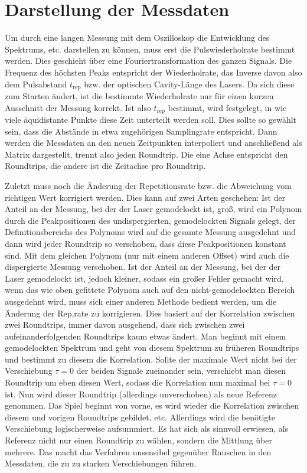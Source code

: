 \documentclass[bachelor,       %
               twoside,        %
               BCOR10mm,       %
               english,ngerman, %
               ]{GAUBM}
\begin{document}
\section{Darstellung der Messdaten}
Um durch eine langen Messung mit dem Oszilloskop die Entwicklung des Spektrums, etc. darstellen zu können, muss erst die Pulswiederholrate bestimmt werden.
Dies geschieht über eine Fouriertransformation des ganzen Signals.
Die Frequenz des höchsten Peaks entspricht der Wiederholrate, das Inverse davon also dem Pulsabstand $t_\text{rep}$ bzw. der optischen Cavity-Länge des Lasers.
Da sich diese zum Starten ändert, ist die bestimmte Wiederholrate nur für einen kurzen Ausschnitt der Messung korrekt.
Ist also $t_\text{rep}$ bestimmt, wird festgelegt, in wie viele äquidistante Punkte diese Zeit unterteilt werden soll.
Dies sollte so gewählt sein, dass die Abstände in etwa zugehörigen Samplingrate entspricht.
Dann werden die Messdaten an den neuen Zeitpunkten interpoliert und anschließend als Matrix dargestellt, trennt also jeden Roundtrip.
Die eine Achse entspricht den Roundtrips, die andere ist die Zeitachse pro Roundtrip.

Zuletzt muss noch die Änderung der Repetitionsrate bzw. die Abweichung vom richtigen Wert korrigiert werden.
Dies kann auf zwei Arten geschehen:
Ist der Anteil an der Messung, bei der der Laser gemodelockt ist, groß, wird ein Polynom durch die Peakpositionen des undispergierten, gemodelockten Signals gelegt, der Definitionsbereichs des Polynoms wird auf die gesamte Messung ausgedehnt und dann wird jeder Roundtrip so verschoben, dass diese Peakpositionen konstant sind.
Mit dem gleichen Polynom (nur mit einem anderen Offset) wird auch die dispergierte Messung verschoben.
Ist der Anteil an der Messung, bei der der Laser gemodelockt ist, jedoch kleiner, sodass ein großer Fehler gemacht wird, wenn das wie oben gefittete Polynom auch auf den nicht-gemodelockten Bereich ausgedehnt wird, muss sich einer anderen Methode bedient werden, um die Änderung der Rep.rate zu korrigieren.
Dies basiert auf der Korrelation zwischen zwei Roundtrips, immer davon ausgehend, dass sich zwischen zwei aufeinanderfolgenden Roundtrips kaum etwas ändert.
Man beginnt mit einem gemodelockten Spektrum und geht von diesem Spektrum zu früheren Roundtrips und bestimmt zu diesem die Korrelation.
Sollte der maximale Wert nicht bei der Verschiebung $\tau=0$ der beiden Signale zueinander sein, verschiebt man diesen Roundtrip um eben diesen Wert, sodass die Korrelation nun maximal bei $\tau=0$ ist.
Nun wird dieser Roundtrip (allerdings unverschoben) als neue Referenz genommen.
Das Spiel beginnt von vorne, es wird wieder die Korrelation zwischen diesem und vorigen Roundtrips gebildet, etc.
Allerdings wird die benötigte Verschiebung logischerweise aufsummiert.
Es hat sich als sinnvoll erwiesen, als Referenz nicht nur einen Roundtrip zu wählen, sondern die Mittlung über mehrere.
Das macht das Verfahren unsensibel gegenüber Rauschen in den Messdaten, die zu zu starken Verschiebungen führen.
\end{document}
